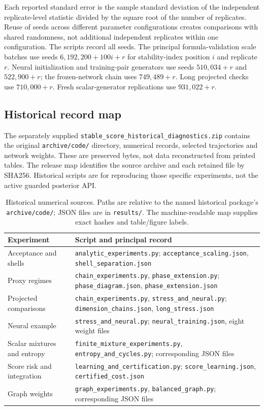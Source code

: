 \documentclass[11pt]{article}
\theoremstyle{definition}\newtheorem{definition}[theorem]{Definition}
\theoremstyle{remark}\newtheorem{remark}[theorem]{Remark}
\numberwithin{equation}{section}
\newcommand{\1}{\mathbf 1}
\begin{document}
Each reported standard error is the sample standard deviation of the independent replicate-level statistic divided by the square root of the number of replicates. Reuse of seeds across different parameter configurations creates comparisons with shared randomness, not additional independent replicates within one configuration. The scripts record all seeds. The principal formula-validation scale batches use seeds $6{,}192{,}200+100i+r$ for stability-index position $i$ and replicate $r$. Neural initialization and training-pair generators use seeds $510{,}034+r$ and $522{,}900+r$; the frozen-network chain uses $749{,}489+r$. Long projected checks use $710{,}000+r$. Fresh scalar-generator replications use $931{,}022+r$.

\subsection{Historical record map}
The separately supplied \texttt{stable\_score\_historical\_diagnostics.zip} contains the original \texttt{archive/code/} directory, numerical records, selected trajectories and network weights. These are preserved bytes, not data reconstructed from printed tables. The release map identifies the source archive and each retained file by SHA256. Historical scripts are for reproducing those specific experiments, not the active guarded posterior API.

\begin{table}[tb]\centering\footnotesize
\caption{Historical numerical sources. Paths are relative to the named historical package's \texttt{archive/code/}; JSON files are in \texttt{results/}. The machine-readable map supplies exact hashes and table/figure labels.}\label{tab:files}
\begin{tabular}{p{.29\linewidth}p{.64\linewidth}}\toprule Experiment & Script and principal record\\\midrule
Acceptance and shells & \texttt{analytic\_experiments.py}; \texttt{acceptance\_scaling.json}, \texttt{shell\_separation.json}\\
Proxy regimes & \texttt{chain\_experiments.py}, \texttt{phase\_extension.py}; \texttt{phase\_diagram.json}, \texttt{phase\_extension.json}\\
Projected comparisons & \texttt{chain\_experiments.py}, \texttt{stress\_and\_neural.py}; \texttt{dimension\_chains.json}, \texttt{long\_stress.json}\\
Neural example & \texttt{stress\_and\_neural.py}; \texttt{neural\_training.json}, eight weight files\\
Scalar mixtures and entropy & \texttt{finite\_mixture\_experiments.py}, \texttt{entropy\_and\_cycles.py}; corresponding JSON files\\
Score risk and integration & \texttt{learning\_and\_certification.py}; \texttt{score\_learning.json}, \texttt{certified\_cost.json}\\
Graph weights & \texttt{graph\_experiments.py}, \texttt{balanced\_graph.py}; corresponding JSON files\\\bottomrule
\end{tabular}\end{table}
\end{document}
